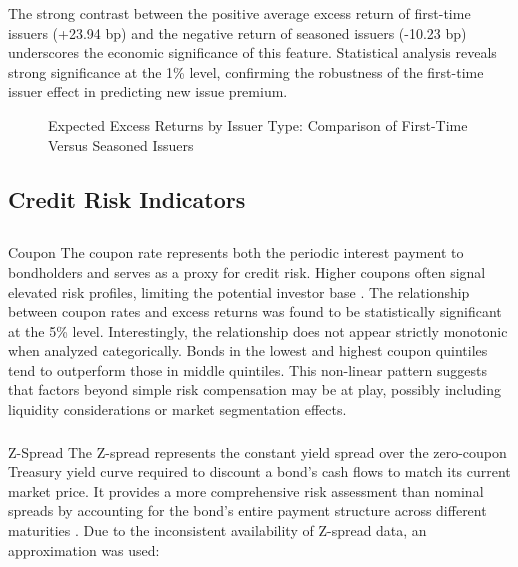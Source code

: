 The strong contrast between the positive average excess return of first-time issuers (+23.94 bp) and the negative return of seasoned issuers (-10.23 bp) underscores the economic significance of this feature. Statistical analysis reveals strong significance at the 1\% level, confirming the robustness of the first-time issuer effect in predicting new issue premium.

\begin{figure}[h]
    \begin{center}
        
    \end{center}
    \caption{Expected Excess Returns by Issuer Type: Comparison of First-Time Versus Seasoned Issuers}
    \label{fig:fti}
\end{figure}

\subsection{Credit Risk Indicators}

\subsection{}{Coupon}
The coupon rate represents both the periodic interest payment to bondholders and serves as a proxy for credit risk. Higher coupons often signal elevated risk profiles, limiting the potential investor base \parencite{Geerts2022PredictingYield}. The relationship between coupon rates and excess returns was found to be statistically significant at the 5\% level. Interestingly, the relationship does not appear strictly monotonic when analyzed categorically. Bonds in the lowest and highest coupon quintiles tend to outperform those in middle quintiles. This non-linear pattern suggests that factors beyond simple risk compensation may be at play, possibly including liquidity considerations or market segmentation effects.

\subsubsection{}{Z-Spread}
The Z-spread represents the constant yield spread over the zero-coupon Treasury yield curve required to discount a bond's cash flows to match its current market price. It provides a more comprehensive risk assessment than nominal spreads by accounting for the bond's entire payment structure across different maturities \parencite[pp. 816 - 818]{Fabozzi2021TheEdition}. Due to the inconsistent availability of Z-spread data, an approximation was used:

